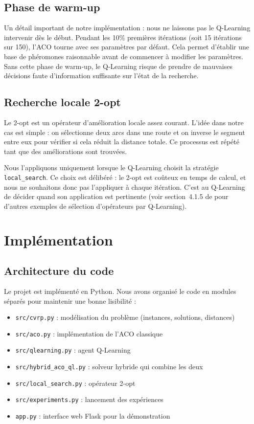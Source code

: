 \documentclass[12pt, a4paper]{article}
\begin{document}
\subsection{Phase de warm-up}

Un détail important de notre implémentation : nous ne laissons pas le Q-Learning intervenir dès le début. Pendant les 10\% premières itérations (soit 15 itérations sur 150), l'ACO tourne avec ses paramètres par défaut. Cela permet d'établir une base de phéromones raisonnable avant de commencer à modifier les paramètres. Sans cette phase de warm-up, le Q-Learning risque de prendre de mauvaises décisions faute d'information suffisante sur l'état de la recherche.

\subsection{Recherche locale 2-opt}

Le 2-opt est un opérateur d'amélioration locale assez courant. L'idée dans notre cas est simple : on sélectionne deux arcs dans une route et on inverse le segment entre eux pour vérifier si cela réduit la distance totale. Ce processus est répété tant que des améliorations sont trouvées.

Nous l'appliquons uniquement lorsque le Q-Learning choisit la stratégie \texttt{local\_search}. Ce choix est délibéré : le 2-opt est coûteux en temps de calcul, et nous ne souhaitons donc pas l'appliquer à chaque itération. C'est au Q-Learning de décider quand son application est pertinente (voir section~4.1.5 de \cite{yang2024qlma} pour d'autres exemples de sélection d'opérateurs par Q-Learning).

\section{Implémentation}

\subsection{Architecture du code}

Le projet est implémenté en Python. Nous avons organisé le code en modules séparés pour maintenir une bonne lisibilité :

\begin{itemize}
    \item \texttt{src/cvrp.py} : modélisation du problème (instances, solutions, distances)
    \item \texttt{src/aco.py} : implémentation de l'ACO classique
    \item \texttt{src/qlearning.py} : agent Q-Learning
    \item \texttt{src/hybrid\_aco\_ql.py} : solveur hybride qui combine les deux
    \item \texttt{src/local\_search.py} : opérateur 2-opt
    \item \texttt{src/experiments.py} : lancement des expériences
    \item \texttt{app.py} : interface web Flask pour la démonstration
\end{itemize}
\end{document}
